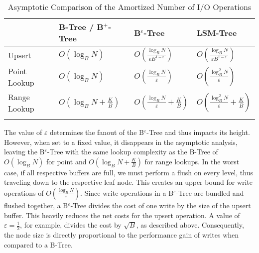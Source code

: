 \begin{table}[h]
	\centering
	\caption{Asymptotic Comparison of the Amortized Number of I/O Operations}
	\label{tab:asymptotic_comparision}
	\vspace*{5mm}
	\begin{tabular}{@{}llll@{}}
		\toprule
		& B-Tree / B$^+$-Tree         & B$^\varepsilon$-Tree                                & LSM-Tree                                            \\ \midrule
		\addlinespace[2mm]
		Upsert       & $O(\log_B N)$               & $O(\frac{\log_B N}{\varepsilon B^{1-\varepsilon}})$ & $O(\frac{\log_B N}{\varepsilon B^{1-\varepsilon}})$ \\
		\addlinespace[2mm]
		Point Lookup & $O(\log_B N)$               & $O(\frac{\log_B N}{\varepsilon})$                   & $O(\frac{\log^2_B N}{\varepsilon})$                 \\
		\addlinespace[2mm]
		Range Lookup & $O(\log_B N + \frac{K}{B})$ & $O(\frac{\log_B N}{\varepsilon} + \frac{K}{B})$     & $O(\frac{\log^2_B N}{\varepsilon} + \frac{K}{B})$   \\ 
		\addlinespace[2mm]
		\bottomrule
	\end{tabular}
\end{table}

The value of $\varepsilon$ determines the fanout of the B$^\varepsilon$-Tree and thus impacts its height. However, when set to a fixed value, it disappears in the asymptotic analysis, leaving the B$^\varepsilon$-Tree with the same lookup complexity as the B-Tree of $O(\log_B N)$ for point and $O(\log_B N + \frac{K}{B})$ for range lookups.\newline
In the worst case, if all respective buffers are full, we must perform a flush on every level, thus traveling down to the respective leaf node. This creates an upper bound for write operations of $O(\frac{\log_B N}{\varepsilon})$.\newline
Since write operations in a B$^\varepsilon$-Tree are bundled and flushed together, a B$^\varepsilon$-Tree divides the cost of one write by the size of the upsert buffer. This heavily reduces the net costs for the upsert operation. A value of $\varepsilon=\frac{1}{2}$, for example, divides the cost by $\sqrt{B}$, as described above. Consequently, the node size is directly proportional to the performance gain of writes when compared to a B-Tree.

